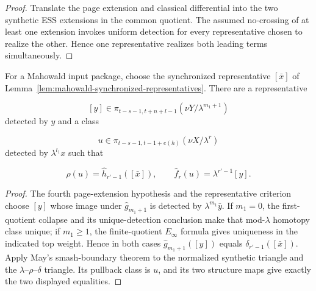\begin{proof}
  Translate the page extension and classical differential into the two
  synthetic ESS extensions in the common quotient.  The assumed no-crossing
  of at least one extension invokes uniform detection for every representative
  chosen to realize the other.  Hence one representative realizes both
  leading terms simultaneously.
\end{proof}

\begin{lemma}
  \label{lem:mahowald-compatible-quotient-lift}
  \notready
  For a Mahowald input package, choose the synchronized representative
  $[\bar x]$ of Lemma~\ref{lem:mahowald-synchronized-representatives}.
  There are a representative

  \[
    [y]\in\pi_{t-s-1,t+n+l-1}(\nu Y/\lambda^{m_1+1})
  \]
  detected by $y$ and a class

  \[
    u\in\pi_{t-s-1,t-1+e(h)}(\nu X/\lambda^r)
  \]
  detected by $\lambda^{l_1}x$ such that

  \[
    \rho(u)=\widehat h_{r'-1}([\bar x]),
    \qquad
    \widehat f_r(u)=\lambda^{r'-1}[y].
  \]
\end{lemma}

\begin{proof}
  The fourth page-extension hypothesis and the representative criterion choose
  $[y]$ whose image under $\widehat g_{m_1+1}$ is detected by
  $\lambda^{m_1}\bar y$.  If $m_1=0$, the first-quotient collapse and its
  unique-detection conclusion make that mod-$\lambda$ homotopy class unique;
  if $m_1\ge1$, the finite-quotient $E_\infty$ formula gives uniqueness in the
  indicated top weight.  Hence in both cases
  $\widehat g_{m_1+1}([y])$ equals
  $\delta_{r'-1}([\bar x])$.  Apply May's smash-boundary theorem to the
  normalized synthetic triangle and the $\lambda$--$\rho$--$\delta$ triangle.
  Its pullback class is $u$, and its two structure maps give exactly the two
  displayed equalities.
\end{proof}

